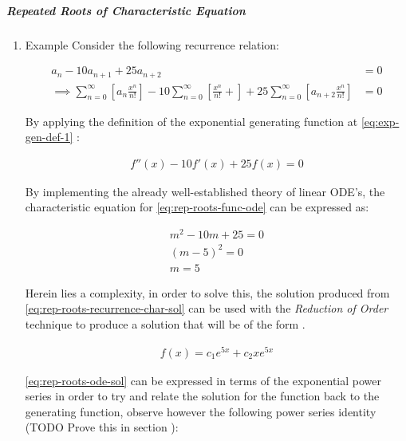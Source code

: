 \documentclass[11pt]{article}
\begin{document}
\subparagraph{Repeated Roots of Characteristic Equation}
\label{rep-roots-recurrence}
\begin{enumerate}
\item Example
\label{sec:org0279f8b}
Consider the following recurrence relation:

\begin{align}
    a_n -  10a_{n+ 1} +  25a_{n+  2}&= 0 \label{eq:hom-repeated-roots-recurrence} \\
    \implies  \sum^{\infty}_{n= 0}   {\left[{ a_n \frac{x^n}{n!} }\right]} - 10 \sum^{\infty}_{n= 0}   {\left[{ \frac{x^n}{n!}+    }\right]} + 25 \sum^{\infty}_{n= 0 }   {\left[{  a_{n+  2 }\frac{x^n}{n!} }\right]}&= 0 \nonumber
\end{align}

By applying the definition of the exponential generating function at \eqref{eq:exp-gen-def-1} :

\begin{align}
    f''{\left({ x }\right)}- 10f'{\left({ x }\right)}+  25f{\left({ x }\right)}= 0 \nonumber \label{eq:rep-roots-func-ode}
\end{align}

By implementing the already well-established theory of linear ODE's, the characteristic equation for \eqref{eq:rep-roots-func-ode} can be expressed as:

\begin{align}
    m^2- 10m+  25 = 0 \nonumber \\
    {\left({ m- 5 }\right)}^2 = 0 \nonumber \\
    m= 5 \label{eq:rep-roots-recurrence-char-sol}
\end{align}

Herein lies a complexity, in order to solve this, the solution produced from \eqref{eq:rep-roots-recurrence-char-sol} can be used with the \emph{Reduction of Order} technique to produce a solution that will be of the form \cite[]{zillMatrixExponential2009}.

\begin{align}
    f{\left({ x }\right)}= c_1e^{5x} +  c_2 x e^{5x} \label{eq:rep-roots-ode-sol}
\end{align}

\eqref{eq:rep-roots-ode-sol} can be expressed in terms of the exponential power series in order to try and relate the solution for the function back to the generating function,
observe however the following power series identity (TODO Prove this in section ):


\end{enumerate}
\end{document}
